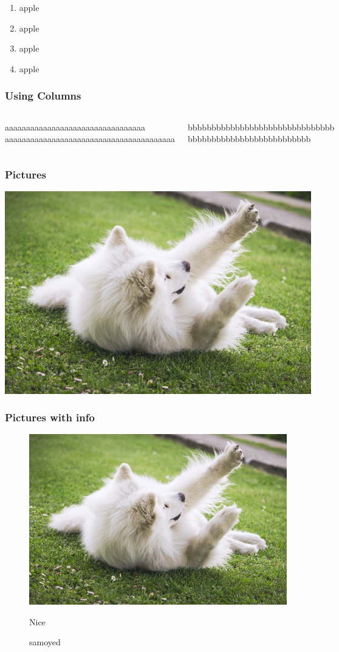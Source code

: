 \documentclass{beamer}
\begin{document}
\begin{frame}
\begin{enumerate}
\item apple
\item apple
\item apple
\item apple
\end{enumerate}
\end{frame}


\begin{frame}
\frametitle{Using Columns}
\begin{columns}
aaaaaaaaaaaaaaaaaaaaaaaaaaaaaaaaa
aaaaaaaaaaaaaaaaaaaaaaaaaaaaaaaaaaaaaaaa

bbbbbbbbbbbbbbbbbbbbbbbbbbbbbbb
bbbbbbbbbbbbbbbbbbbbbbbbbb
\end{columns}
\end{frame}

\begin{frame}
\frametitle{Pictures}
\includegraphics[scale=1]{samoyed.jpg}
\end{frame}

\begin{frame}
\frametitle{Pictures with info}
\begin{figure}
\includegraphics[scale=0.5]{samoyed.jpg}
\caption{samoyed}
Nice
\end{figure}
\end{frame}
\end{document}
